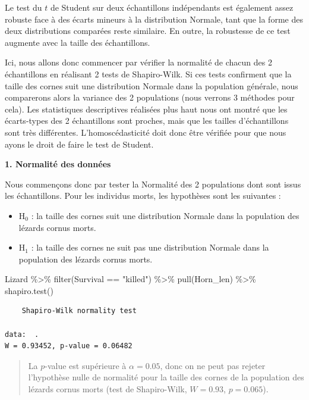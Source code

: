 \documentclass[
  a4paper,
]{article}
\newenvironment{Shaded}{\begin{snugshade}}{\end{snugshade}}
\newcommand{\FunctionTok}[1]{\textcolor[rgb]{0.39,0.29,0.61}{#1}}
\newcommand{\NormalTok}[1]{\textcolor[rgb]{0.12,0.11,0.11}{#1}}
\newcommand{\SpecialCharTok}[1]{\textcolor[rgb]{0.24,0.68,0.91}{#1}}
\newcommand{\StringTok}[1]{\textcolor[rgb]{0.75,0.01,0.01}{#1}}
\providecommand{\tightlist}{%
  \setlength{\itemsep}{0pt}\setlength{\parskip}{0pt}}
\begin{document}
Le test du \(t\) de Student sur deux échantillons indépendants est également assez robuste face à des écarts mineurs à la distribution Normale, tant que la forme des deux distributions comparées reste similaire. En outre, la robustesse de ce test augmente avec la taille des échantillons.

Ici, nous allons donc commencer par vérifier la normalité de chacun des 2 échantillons en réalisant 2 tests de Shapiro-Wilk. Si ces tests confirment que la taille des cornes suit une distribution Normale dans la population générale, nous comparerons alors la variance des 2 populations (nous verrons 3 méthodes pour cela). Les statistiques descriptives réalisées plus haut nous ont montré que les écarts-types des 2 échantillons sont proches, mais que les tailles d'échantillons sont très différentes. L'homoscédasticité doit donc être vérifiée pour que nous ayons le droit de faire le test de Student.

\textbf{1. Normalité des données}

Nous commençons donc par tester la Normalité des 2 populations dont sont issus les échantillons. Pour les individus morts, les hypothèses sont les suivantes :

\begin{itemize}
\tightlist
\item
  H\(_0\) : la taille des cornes suit une distribution Normale dans la population des lézards cornus morts.
\item
  H\(_1\) : la taille des cornes ne suit pas une distribution Normale dans la population des lézards cornus morts.
\end{itemize}

\begin{Shaded}
\begin{Highlighting}[]
\NormalTok{Lizard }\SpecialCharTok{\%\textgreater{}\%} 
  \FunctionTok{filter}\NormalTok{(Survival }\SpecialCharTok{==} \StringTok{"killed"}\NormalTok{) }\SpecialCharTok{\%\textgreater{}\%} 
  \FunctionTok{pull}\NormalTok{(Horn\_len) }\SpecialCharTok{\%\textgreater{}\%} 
  \FunctionTok{shapiro.test}\NormalTok{()}
\end{Highlighting}
\end{Shaded}

\begin{verbatim}
    Shapiro-Wilk normality test

data:  .
W = 0.93452, p-value = 0.06482
\end{verbatim}

\begin{quote}
La \(p\)-value est supérieure à \(\alpha = 0.05\), donc on ne peut pas rejeter l'hypothèse nulle de normalité pour la taille des cornes de la population des lézards cornus morts (test de Shapiro-Wilk, \(W = 0.93\), \(p = 0.065\)).
\end{quote}
\end{document}
